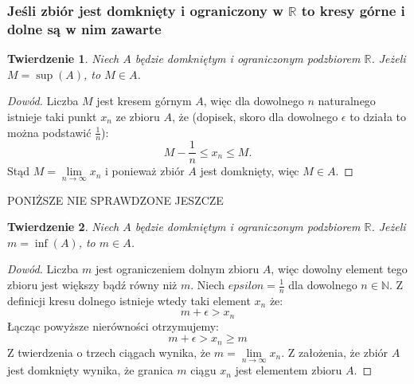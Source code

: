 \documentclass{article}
\newtheorem*{theorem}{Twierdzenie}
\begin{document}
\subsubsection{Jeśli zbiór jest domknięty i ograniczony w \(\mathbb{R}\) to kresy górne i dolne są w nim zawarte}
\begin{theorem}
    Niech \(A\) będzie domkniętym i ograniczonym podzbiorem \(\mathbb{R}\). Jeżeli \(M = \sup(A)\), to 
    \(M \in A\).
\end{theorem}
\begin{proof}[Dowód]
    Liczba \(M\) jest kresem górnym \(A\), więc dla dowolnego \(n\) naturalnego istnieje taki
    punkt \(x_n\) ze zbioru \(A\), że (dopisek, skoro dla dowolnego \(\epsilon\) to działa to można podstawić \(\frac{1}{n}\)):
    \begin{equation*}
        M - \frac{1}{n} \leq x_n \leq M.
    \end{equation*}
    Stąd \(M = \lim\limits_{n \to \infty} x_n\) i ponieważ zbiór \(A\) jest domknięty, więc \(M \in A\).
\end{proof}
\begin{center}
    PONIŻSZE NIE SPRAWDZONE JESZCZE
\end{center}
\begin{theorem}
    Niech \(A\) będzie domkniętym i ograniczonym podzbiorem \(\mathbb{R}\). Jeżeli \(m = \inf(A)\), to 
    \(m \in A\).
\end{theorem}
\begin{proof}[Dowód]
    Liczba \(m\) jest ograniczeniem dolnym zbioru \(A\), więc dowolny element tego zbioru jest większy bądź równy niż
    \(m\). Niech \(epsilon = \frac{1}{n}\) dla dowolnego \(n \in \mathbb{N}\). 
    Z definicji kresu dolnego istnieje wtedy taki element \(x_n\) że:
    \begin{equation*}
        m + \epsilon > x_n
    \end{equation*}
    Łącząc powyższe nierówności otrzymujemy:
    \begin{equation*}
        m + \epsilon > x_n \geq m
    \end{equation*}
    Z twierdzenia o trzech ciągach wynika, że \(m = \lim\limits_{n \to \infty} x_n\). Z założenia, że zbiór \(A\) jest
    domknięty wynika, że granica \(m\) ciągu \(x_n\) jest elementem zbioru \(A\).
\end{proof}
\end{document}
